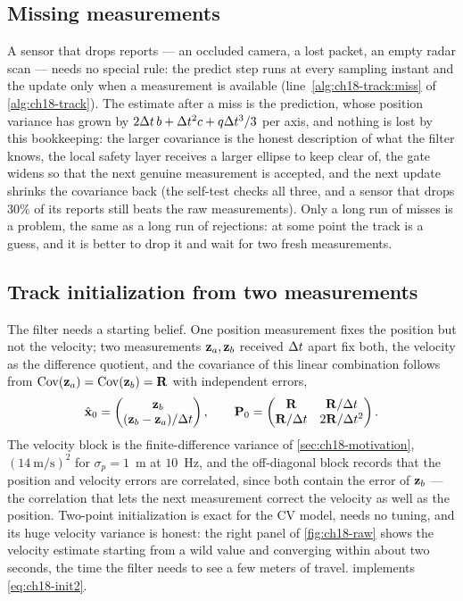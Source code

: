 \subsection{Missing measurements}
\label{sec:ch18-missing}

A sensor that drops reports --- an occluded camera, a lost packet, an empty
radar scan --- needs no special rule: the predict step runs at every sampling
instant and the update only when a measurement is available
(line~\ref{alg:ch18-track:miss} of \cref{alg:ch18-track}). The estimate after
a miss is the prediction, whose position variance has grown by
$2\Delta t\,b+\Delta t^2c+q\Delta t^3/3$ per axis, and nothing is lost by this bookkeeping:
the larger covariance is the honest description of what the filter knows,
the local safety layer receives a larger ellipse to keep clear of, the gate widens
so that the next genuine measurement is accepted, and the next update shrinks
the covariance back (the self-test checks all three, and a sensor that drops
$30\%$ of its reports still beats the raw measurements). Only a long run of
misses is a problem, the same as a long run of rejections: at some point the
track is a guess, and it is better to drop it and wait for two fresh
measurements.

\subsection{Track initialization from two measurements}
\label{sec:ch18-init}

The filter needs a starting belief. One position measurement fixes the
position but not the velocity; two measurements $\mathbf{z}_a,\mathbf{z}_b$ received
$\Delta t$ apart fix both, the velocity as the difference quotient, and the
covariance of this linear combination follows from
$\operatorname{Cov}(\mathbf{z}_a)=\operatorname{Cov}(\mathbf{z}_b)=\mathbf{R}$
with independent errors,
\begin{equation}
  \hat{\mathbf{x}}_0=\begin{pmatrix}\mathbf{z}_b\\ (\mathbf{z}_b-\mathbf{z}_a)/\Delta t\end{pmatrix},\qquad
  \mathbf{P}_0=\begin{pmatrix}\mathbf{R} & \mathbf{R}/\Delta t\\ \mathbf{R}/\Delta t & 2\mathbf{R}/\Delta t^2\end{pmatrix}.
  \label{eq:ch18-init2}
\end{equation}
The velocity block is the finite-difference variance of
\cref{sec:ch18-motivation}, $(14~\mathrm{m/s})^2$ for $\sigma_p=1$~m at
$10$~Hz, and the off-diagonal block records that the position and velocity
errors are correlated, since both contain the error of $\mathbf{z}_b$ --- the
correlation that lets the next measurement correct the velocity as well as
the position. Two-point initialization is exact
for the CV model, needs no tuning, and its huge velocity variance is honest:
the right panel of \cref{fig:ch18-raw} shows the velocity estimate starting
from a wild value and converging within about two seconds, the time the
filter needs to see a few meters of travel. 
implements \cref{eq:ch18-init2}.


